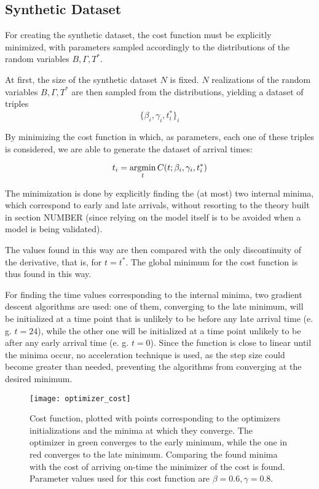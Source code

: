 \subsection{Synthetic Dataset}
\label{sec:synthetic-dataset}

For creating the synthetic dataset,
the cost function must be explicitly minimized,
with parameters sampled accordingly to the distributions of the random variables \(B, \Gamma, T^*\).

At first, the size of the synthetic dataset \(N\) is fixed.
\(N\) realizations of the random variables \(B, \Gamma, T^*\) are then sampled from the distributions,
yielding a dataset of triples
\begin{equation*}
  \{\beta_i, \gamma_i, t^*_i\}_i
\end{equation*}

By minimizing the cost function in which, as parameters,
each one of these triples is considered,
we are able to generate the dataset of arrival times:

\begin{equation*}
  t_i = \operatorname*{argmin}_t C(t; \beta_i, \gamma_i, t^*_i)
\end{equation*}

The minimization is done by explicitly finding the (at most) two internal minima,
which correspond to early and late arrivals,
without resorting to the theory built in section NUMBER
(since relying on the model itself is to be avoided when a model is being validated).

The values found in this way are then compared with the only discontinuity of the derivative,
that is, for \(t = t^*\).
The global minimum for the cost function is thus found in this way.

For finding the time values corresponding to the internal minima,
two gradient descent algorithms are used:
one of them, converging to the late minimum,
will be initialized at a time point that is unlikely to be before any late arrival time (e. g. \(t = 24\)),
while the other one will be initialized at a time point unlikely to be after any early arrival time (e. g. \(t = 0\)).
Since the function is close to linear until the minima occur,
no acceleration technique is used,
as the step size could become greater than needed,
preventing the algorithms from converging at the desired minimum.

\begin{figure}
  \centering
  \texttt{[image: optimizer\_cost]}
  \caption{
    Cost function,
    plotted with points corresponding to the optimizers initializations and the minima at which they converge.
    The optimizer in green converges to the early minimum,
    while the one in red converges to the late minimum.
    Comparing the found minima with the cost of arriving on-time the minimizer of the cost is found.
    Parameter values used for this cost function are \(\beta = 0.6, \gamma = 0.8\).
  }
  \label{fig:optimizer-cost}
\end{figure}

